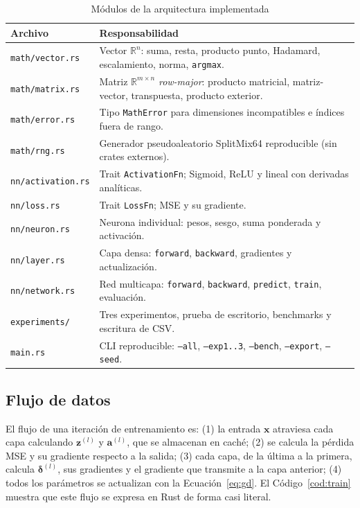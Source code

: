 \begin{table}[H]
\caption{Módulos de la arquitectura implementada}\label{tab:arquitectura}
\small
\begin{tabularx}{\textwidth}{@{}l >{\raggedright\arraybackslash}X@{}}
\toprule
Archivo & Responsabilidad \\
\midrule
\texttt{math/vector.rs} & Vector $\mathbb{R}^n$: suma, resta, producto punto, Hadamard, escalamiento, norma, \texttt{argmax}. \\
\texttt{math/matrix.rs} & Matriz $\mathbb{R}^{m\times n}$ \emph{row-major}: producto matricial, matriz-vector, transpuesta, producto exterior. \\
\texttt{math/error.rs} & Tipo \texttt{MathError} para dimensiones incompatibles e índices fuera de rango. \\
\texttt{math/rng.rs} & Generador pseudoaleatorio SplitMix64 reproducible (sin crates externos). \\
\texttt{nn/activation.rs} & Trait \texttt{ActivationFn}; Sigmoid, ReLU y lineal con derivadas analíticas. \\
\texttt{nn/loss.rs} & Trait \texttt{LossFn}; MSE y su gradiente. \\
\texttt{nn/neuron.rs} & Neurona individual: pesos, sesgo, suma ponderada y activación. \\
\texttt{nn/layer.rs} & Capa densa: \texttt{forward}, \texttt{backward}, gradientes y actualización. \\
\texttt{nn/network.rs} & Red multicapa: \texttt{forward}, \texttt{backward}, \texttt{predict}, \texttt{train}, evaluación. \\
\texttt{experiments/} & Tres experimentos, prueba de escritorio, benchmarks y escritura de CSV. \\
\texttt{main.rs} & CLI reproducible: \texttt{--all}, \texttt{--exp1..3}, \texttt{--bench}, \texttt{--export}, \texttt{--seed}. \\
\bottomrule
\end{tabularx}
\par{}
\end{table}

\subsection{Flujo de datos}
El flujo de una iteración de entrenamiento es: (1) la entrada $\mathbf{x}$ atraviesa cada capa calculando $\mathbf{z}^{(l)}$ y $\mathbf{a}^{(l)}$, que se almacenan en caché; (2) se calcula la pérdida MSE y su gradiente respecto a la salida; (3) cada capa, de la última a la primera, calcula $\boldsymbol{\delta}^{(l)}$, sus gradientes y el gradiente que transmite a la capa anterior; (4) todos los parámetros se actualizan con la Ecuación~\eqref{eq:gd}. El Código~\ref{cod:train} muestra que este flujo se expresa en Rust de forma casi literal.

